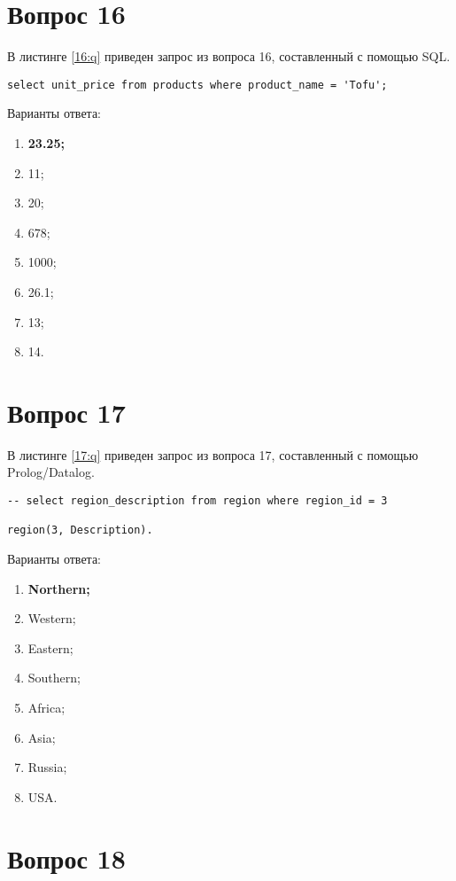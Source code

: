 \begin{appendices}
\section{Вопрос 16}

В листинге \ref{16:q} приведен запрос из вопроса 16, составленный с помощью SQL.

\begin{lstlisting}[label=16:q,caption=Вопрос 16]
select unit_price from products where product_name = 'Tofu';
\end{lstlisting}

Варианты ответа:

\begin{enumerate}
	\item \textbf{23.25;}
	\item 11;
	\item 20;
	\item 678;
	\item 1000;
	\item 26.1;
	\item 13;
	\item 14.
\end{enumerate}

\section{Вопрос 17}

В листинге \ref{17:q} приведен запрос из вопроса 17, составленный с помощью Prolog/Datalog.

\begin{lstlisting}[label=17:q,caption=Вопрос 17]
-- select region_description from region where region_id = 3

region(3, Description).
\end{lstlisting}

Варианты ответа:

\begin{enumerate}
	\item \textbf{Northern;}
	\item Western;
	\item Eastern;
	\item Southern;
	\item Africa;
	\item Asia;
	\item Russia;
	\item USA.
\end{enumerate}

\section{Вопрос 18}


\end{appendices}
